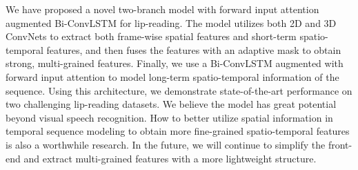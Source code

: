 \documentclass{bmvc2k}
\begin{document}
We have proposed a novel two-branch model with forward input attention augmented Bi-ConvLSTM for lip-reading. The model utilizes both 2D and 3D ConvNets to extract both frame-wise spatial features and short-term spatio-temporal features, and then fuses the features with an adaptive mask to obtain strong, multi-grained features. Finally, we use a Bi-ConvLSTM augmented with forward input attention to model long-term spatio-temporal information of the sequence. Using this architecture, we demonstrate state-of-the-art performance on two challenging lip-reading datasets. We believe the model has great potential beyond visual speech recognition. How to better utilize spatial information in temporal sequence modeling to obtain more fine-grained spatio-temporal features is also a worthwhile research. In the future, we will continue to simplify the front-end and extract multi-grained features with a more lightweight structure.


\end{document}
